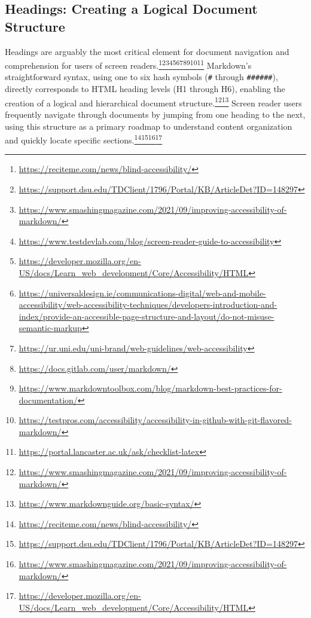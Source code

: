 \subsection{Headings: Creating a Logical Document Structure}
Headings are arguably the most critical element for document navigation and comprehension for users of screen readers.\footnote{\url{https://reciteme.com/news/blind-accessibility/}}\footnote{\url{https://support.dsu.edu/TDClient/1796/Portal/KB/ArticleDet?ID=148297}}\footnote{\url{https://www.smashingmagazine.com/2021/09/improving-accessibility-of-markdown/}}\footnote{\url{https://www.testdevlab.com/blog/screen-reader-guide-to-accessibility}}\footnote{\url{https://developer.mozilla.org/en-US/docs/Learn_web_development/Core/Accessibility/HTML}}\footnote{\url{https://universaldesign.ie/communications-digital/web-and-mobile-accessibility/web-accessibility-techniques/developers-introduction-and-index/provide-an-accessible-page-structure-and-layout/do-not-misuse-semantic-markup}}\footnote{\url{https://ur.uni.edu/uni-brand/web-guidelines/web-accessibility}}\footnote{\url{https://docs.gitlab.com/user/markdown/}}\footnote{\url{https://www.markdowntoolbox.com/blog/markdown-best-practices-for-documentation/}}\footnote{\url{https://testpros.com/accessibility/accessibility-in-github-with-git-flavored-markdown/}}\footnote{\url{https://portal.lancaster.ac.uk/ask/checklist-latex}} Markdown's straightforward syntax, using one to six hash symbols (\texttt{\#} through \texttt{\#\#\#\#\#\#}), directly corresponds to HTML heading levels (H1 through H6), enabling the creation of a logical and hierarchical document structure.\footnote{\url{https://www.smashingmagazine.com/2021/09/improving-accessibility-of-markdown/}}\footnote{\url{https://www.markdownguide.org/basic-syntax/}} Screen reader users frequently navigate through documents by jumping from one heading to the next, using this structure as a primary roadmap to understand content organization and quickly locate specific sections.\footnote{\url{https://reciteme.com/news/blind-accessibility/}}\footnote{\url{https://support.dsu.edu/TDClient/1796/Portal/KB/ArticleDet?ID=148297}}\footnote{\url{https://www.smashingmagazine.com/2021/09/improving-accessibility-of-markdown/}}\footnote{\url{https://developer.mozilla.org/en-US/docs/Learn_web_development/Core/Accessibility/HTML}}

